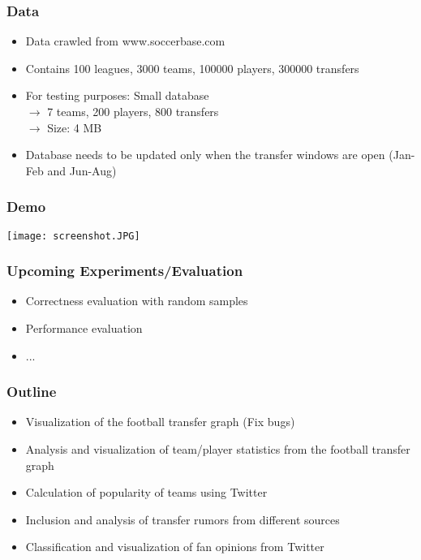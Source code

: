 \documentclass{beamer}
\begin{document}
	\begin{frame}
    \frametitle{Data}
		\begin{itemize}
      \item Data crawled from www.soccerbase.com
			\item Contains 100 leagues, 3000 teams, 100000 players, 300000 transfers
			\item For testing purposes: Small database \\
						$\rightarrow$ 7 teams, 200 players, 800 transfers \\
						$\rightarrow$ Size: 4 MB
			\item Database needs to be updated only when the transfer windows are open (Jan-Feb and Jun-Aug)
		\end{itemize}
  \end{frame}
	
	\begin{frame}
    \frametitle{Demo}
		\begin{center}
      \texttt{[image: screenshot.JPG]}\\
			\end{center}
  \end{frame}
	
	
	\begin{frame}
    \frametitle{Upcoming Experiments/Evaluation}
		\begin{itemize}
      \item Correctness evaluation with random samples
			\item Performance evaluation
			\item ...
		\end{itemize}
  \end{frame}
	
	\begin{frame}
    \frametitle{Outline}
		\begin{itemize}
      \item Visualization of the football transfer graph (Fix bugs)\checkmark
			\item Analysis and visualization of team/player statistics from the football transfer graph
			\item Calculation of popularity of teams using Twitter
			\item Inclusion and analysis of transfer rumors from different sources
			\item Classification and visualization of fan opinions from Twitter
		\end{itemize}
  \end{frame}
	
\end{document}
